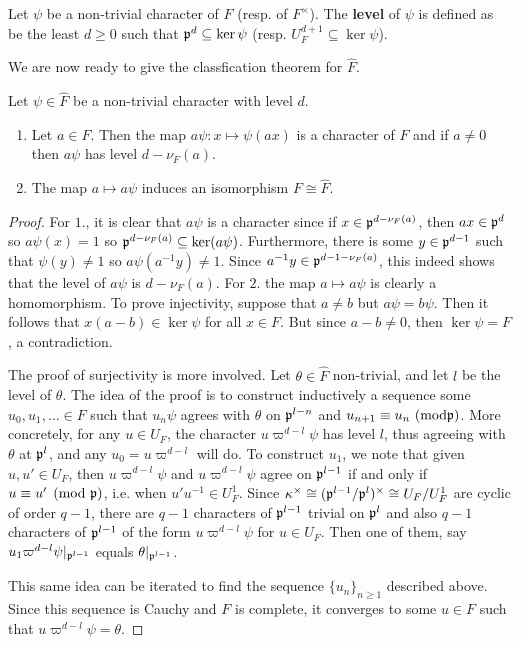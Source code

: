 \begin{defn}
    Let $\psi$ be a non-trivial character of $F$ (resp. of $F^{\times}$). The \textbf{level} of $\psi$ is defined as be the least $d\geq0$ such that $\mathfrak{p}^d\subseteq\ker\psi$ (resp. $U_F^{d+1}\subseteq\ker\psi$).
\end{defn}

We are now ready to give the classfication theorem for $\hat{F}$.

\begin{thm}
    Let $\psi\in\hat{F}$ be a non-trivial character with level $d$. 
    \begin{enumerate}
        \item Let $a\in F$. Then the map $a\psi:x\mapsto\psi(ax)$ is a character of $F$ and if $a\neq0$ then $a\psi$ has level $d-\nu_F(a)$.
        \item The map $a\mapsto a\psi$ induces an isomorphism $F\cong\hat{F}$.
    \end{enumerate}
\end{thm}
\begin{proof}
    For $1.$, it is clear that $a\psi$ is a character since if $x\in\mathfrak{p}^{d-\nu_F(a)}$, then $ax\in\mathfrak{p}^d$ so $a\psi(x)=1$ so $\mathfrak{p}^{d-\nu_F(a)}\subseteq\ker(a\psi)$. Furthermore, there is some $y\in\mathfrak{p}^{d-1}$ such that $\psi(y)\neq1$ so $a\psi(a^{-1}y)\neq1$. Since $a^{-1}y\in\mathfrak{p}^{d-1-\nu_F(a)}$, this indeed shows that the level of $a\psi$ is $d-\nu_F(a)$.
    For $2.$ the map $a\mapsto a\psi$ is clearly a homomorphism. To prove injectivity, suppose that $a\neq b$ but $a\psi=b\psi$. Then it follows that $x(a-b)\in\ker\psi$ for all $x\in F$. But since $a-b\neq 0$, then $\ker\psi=F$, a contradiction.

    The proof of surjectivity is more involved. Let $\theta\in\hat{F}$ non-trivial, and let $l$ be the level of $\theta$. The idea of the proof is to construct inductively a sequence some $u_0,u_1,\ldots\in F$ such that $u_n\psi$ agrees with $\theta$ on $\mathfrak{p}^{l-n}$ and $u_{n+1}\equiv u_n\ (\mathrm{mod }\mathfrak{p})$. More concretely, for any $u\in U_F$, the character $u\varpi^{d-l}\psi$ has level $l$, thus agreeing with $\theta$ at $\mathfrak{p}^l$, and any $u_0=u\varpi^{d-l}$ will do. To construct $u_1$, we note that given $u,u'\in U_F$, then $u\varpi^{d-l}\psi$ and $u\varpi^{d-l}\psi$ agree on $\mathfrak{p}^{l-1}$ if and only if $u\equiv u'\pmod{\mathfrak{p}}$, i.e. when $u'u^{-1}\in U_F^1$. Since $\kappa^{\times}\cong(\mathfrak{p}^{l-1}/\mathfrak{p}^l)^{\times}\cong U_F/U_F^1$ are cyclic of order $q-1$, there are $q-1$ characters of $\mathfrak{p}^{l-1}$ trivial on $\mathfrak{p}^l$ and also $q-1$ characters of $\mathfrak{p}^{l-1}$ of the form $u\varpi^{d-l}\psi$ for $u\in U_F$. Then one of them, say $u_1\varpi^{d-l}\psi|_{\mathfrak{p}^{l-1}}$ equals $\theta|_{\mathfrak{p}^{l-1}}$.

    This same idea can be iterated to find the sequence $\{u_n\}_{n\geq1}$ described above. Since this sequence is Cauchy and $F$ is complete, it converges to some $u\in F$ such that $u\varpi^{d-l}\psi=\theta$.
\end{proof}


